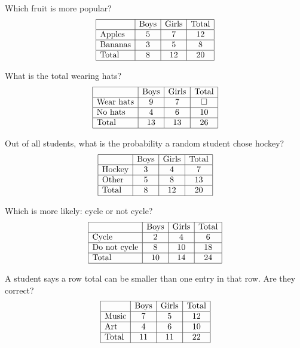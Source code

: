 \documentclass[17pt,a4paper,landscape]{extarticle}
\begin{document}
\begin{tasks}
\task Which fruit is more popular?
\[
\begin{array}{|l|c|c|c|}
\hline
 & \text{Boys} & \text{Girls} & \text{Total} \\\hline
\text{Apples} & 5 & 7 & 12 \\\hline
\text{Bananas} & 3 & 5 & 8 \\\hline
\text{Total} & 8 & 12 & 20 \\\hline
\end{array}
\]

\task What is the total wearing hats?
\[
\begin{array}{|l|c|c|c|}
\hline
 & \text{Boys} & \text{Girls} & \text{Total} \\\hline
\text{Wear hats} & 9 & 7 & \square \\\hline
\text{No hats} & 4 & 6 & 10 \\\hline
\text{Total} & 13 & 13 & 26 \\\hline
\end{array}
\]

\task Out of all students, what is the probability a random student chose hockey?
\[
\begin{array}{|l|c|c|c|}
\hline
 & \text{Boys} & \text{Girls} & \text{Total} \\\hline
\text{Hockey} & 3 & 4 & 7 \\\hline
\text{Other} & 5 & 8 & 13 \\\hline
\text{Total} & 8 & 12 & 20 \\\hline
\end{array}
\]

\task Which is more likely: cycle or not cycle?
\[
\begin{array}{|l|c|c|c|}
\hline
 & \text{Boys} & \text{Girls} & \text{Total} \\\hline
\text{Cycle} & 2 & 4 & 6 \\\hline
\text{Do not cycle} & 8 & 10 & 18 \\\hline
\text{Total} & 10 & 14 & 24 \\\hline
\end{array}
\]

\task A student says a row total can be smaller than one entry in that row. Are they correct?
\[
\begin{array}{|l|c|c|c|}
\hline
 & \text{Boys} & \text{Girls} & \text{Total} \\\hline
\text{Music} & 7 & 5 & 12 \\\hline
\text{Art} & 4 & 6 & 10 \\\hline
\text{Total} & 11 & 11 & 22 \\\hline
\end{array}
\]
\end{tasks}
\end{document}
